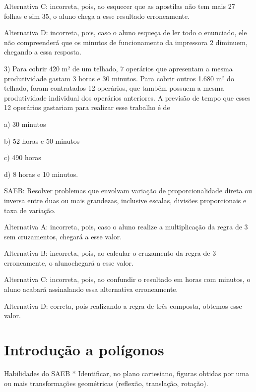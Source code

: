 Alternativa C: incorreta, pois, ao esquecer que as apostilas não tem
mais 27 folhas e sim 35, o aluno chega a esse resultado erroneamente.

Alternativa D: incorreta, pois, caso o aluno esqueça de ler todo o
enunciado, ele não compreenderá que os minutos de funcionamento da
impressora 2 diminuem, chegando a essa resposta.

3) Para cobrir 420 m² de um telhado, 7 operários que apresentam a mesma
produtividade gastam 3 horas e 30 minutos. Para cobrir outros 1.680 m²
do telhado, foram contratados 12 operários, que também possuem a mesma
produtividade individual dos operários anteriores. A previsão de tempo
que esses 12 operários gastariam para realizar esse trabalho é de

a) 30 minutos

b) 52 horas e 50 minutos

c) 490 horas

d) 8 horas e 10 minutos.

SAEB: Resolver problemas que envolvam variação de proporcionalidade
direta ou inversa entre duas ou mais grandezas, inclusive escalas,
divisões proporcionais e taxa de variação.

Alternativa A: incorreta, pois, caso o aluno realize a multiplicação da
regra de 3 sem cruzamentos, chegará a esse valor.

Alternativa B: incorreta, pois, ao calcular o cruzamento da regra de 3
erroneamente, o alunochegará a esse valor.

Alternativa C: incorreta, pois, ao confundir o resultado em horas com
minutos, o aluno acabará assinalando essa alternativa erroneamente.

Alternativa D: correta, pois realizando a regra de três composta,
obtemos esse valor.

\chapter{Introdução a polígonos}

Habilidades do SAEB * Identificar, no plano cartesiano, figuras obtidas
por uma ou mais transformações geométricas (reflexão, translação,
rotação).

